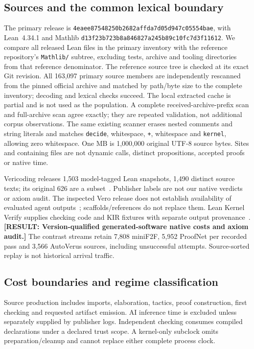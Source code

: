 \documentclass[10pt,twocolumn]{article}
\newcommand{\missing}[1]{\textbf{[RESULT: #1]}}
\begin{document}
\subsection{Sources and the common lexical boundary}
The primary release is
\texttt{4eaee87548250b2682affda7d05d947c05554bae},
with Lean~4.34.1 and Mathlib
\texttt{d13f23b723b8a846827a245b89c10fc7d3f11612}.
We compare all released Lean files in the primary inventory with the
reference repository's \texttt{Mathlib/} subtree, excluding tests,
archive and tooling directories from that reference denominator.
The reference source tree is checked at its exact Git revision.
All 163,097 primary source members are independently rescanned from the
pinned official archive and matched by path/byte size to the complete
inventory; decoding and lexical checks succeed.
The local extracted cache is partial and is not used as the population.
A complete received-archive-prefix scan and full-archive scan agree exactly;
they are repeated validation, not additional corpus observations.
The same existing scanner erases nested comments and string literals and
matches \texttt{decide}, whitespace, \texttt{+}, whitespace and
\texttt{kernel}, allowing zero whitespace.
One MB is 1,000,000 original UTF-8 source bytes.
Sites and containing files are not dynamic calls, distinct propositions,
accepted proofs or native time.

Vericoding releases 1,503 model-tagged Lean snapshots, 1,490 distinct source
texts; its original 626 are a subset~\cite{vericodingOutputs2026}.
Publisher labels are not our native verdicts or axiom audit.
The inspected Vero release does not establish availability of evaluated
agent outputs~\cite{vero2026}; scaffolds/references do not replace them.
Lean Kernel Verify supplies checking code and KIR fixtures with separate
output provenance~\cite{leanKernelVerify}.
\missing{Version-qualified generated-software native costs and axiom audit.}
The contrast streams retain 7,808 miniF2F, 5,952 ProofNet per recorded pass
and 3,566 AutoVerus sources, including unsuccessful attempts.
Source-sorted replay is not historical arrival traffic.

\subsection{Cost boundaries and regime classification}
Source production includes imports, elaboration, tactics, proof construction,
first checking and requested artifact emission.
AI inference time is excluded unless separately supplied by publisher logs.
Independent checking consumes compiled declarations under a declared trust
scope. A kernel-only subclock omits preparation/cleanup and cannot replace
either complete process clock.
\end{document}
